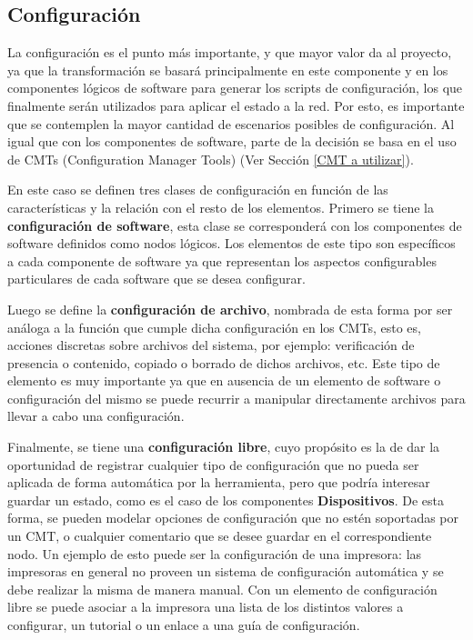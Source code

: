 \subsection{Configuración}
La configuración es el punto más importante, y que mayor valor da al proyecto, ya que la transformación se basará principalmente en este componente y en los componentes lógicos de software para generar los scripts de configuración, los que finalmente serán utilizados para aplicar el estado a la red.
Por esto, es importante que se contemplen la mayor cantidad de escenarios posibles de configuración.
Al igual que con los componentes de software, parte de la decisión se basa en el uso de CMTs (Configuration Manager Tools) (Ver Sección \ref{CMT a utilizar}).

En este caso se definen tres clases de configuración en función de las características y la relación con el resto de los elementos.
Primero se tiene la \textbf{configuración de software}, esta clase se corresponderá con los componentes de software definidos como nodos lógicos. Los elementos de este tipo son específicos a cada componente de software ya que representan los aspectos configurables particulares de cada software que se desea configurar.

Luego se define la \textbf{configuración de archivo}, nombrada de esta forma por ser análoga a la función que cumple dicha configuración en los CMTs, esto es, acciones discretas sobre archivos del sistema, por ejemplo: verificación de presencia o contenido, copiado o borrado de dichos archivos, etc. Este tipo de elemento es muy importante ya que en ausencia de un elemento de software o configuración del mismo se puede recurrir a manipular directamente archivos para llevar a cabo una configuración.

Finalmente, se tiene una \textbf{configuración libre}, cuyo propósito es la de dar la oportunidad de registrar cualquier tipo de configuración que no pueda ser aplicada de forma automática por la herramienta, pero que podría interesar guardar un estado, como es el caso de los componentes \textbf{Dispositivos}. De esta forma, se pueden modelar opciones de configuración que no estén soportadas por un CMT, o cualquier comentario que se desee guardar en el correspondiente nodo. 
Un ejemplo de esto puede ser la configuración de una impresora: las impresoras en general no proveen un sistema de configuración automática y se debe realizar la misma de manera manual. Con un elemento de configuración libre se puede asociar a la impresora una lista de los distintos valores a configurar, un tutorial o un enlace a una guía de configuración.

